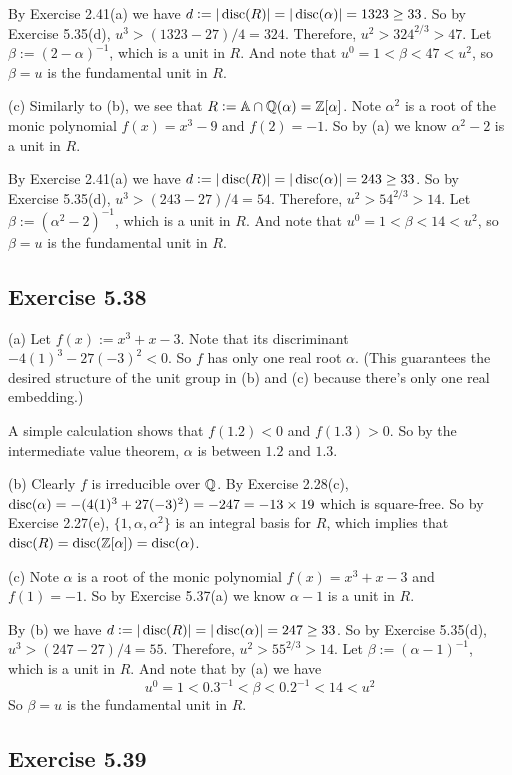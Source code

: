 \documentclass[../Marcus.tex]{subfiles}
\begin{document}
By Exercise 2.41(a) we have $d := |\operatorname{disc}(R)| = |\operatorname{disc}(\alpha)| = 1323 \geq 33$. So by Exercise 5.35(d), $u^3 > (1323-27)/4 = 324$. Therefore, $u^2 > 324^{2/3} > 47$. Let $\beta:=(2-\alpha)^{-1}$, which is a unit in $R$. And note that $u^0 = 1 < \beta < 47 < u^2$, so $\beta=u$ is the fundamental unit in $R$.

(c) Similarly to (b), we see that $R:= \mathbb{A}\cap\mathbb{Q}(\alpha) = \mathbb{Z}[\alpha]$. Note $\alpha^2$ is a root of the monic polynomial $f(x)=x^3-9$ and $f(2)=-1$. So by (a) we know $\alpha^2-2$ is a unit in $R$.

By Exercise 2.41(a) we have $d := |\operatorname{disc}(R)| = |\operatorname{disc}(\alpha)| = 243 \geq 33$. So by Exercise 5.35(d), $u^3 > (243-27)/4 = 54$. Therefore, $u^2 > 54^{2/3} > 14$. Let $\beta:=(\alpha^2-2)^{-1}$, which is a unit in $R$. And note that $u^0 = 1 < \beta < 14 < u^2$, so $\beta=u$ is the fundamental unit in $R$.

\subsection*{Exercise 5.38}

(a) Let $f(x):=x^3+x-3$. Note that its discriminant $-4(1)^3-27(-3)^2 < 0$. So $f$ has only one real root $\alpha$. (This guarantees the desired structure of the unit group in (b) and (c) because there's only one real embedding.)

A simple calculation shows that $f(1.2) < 0 $ and $f(1.3) > 0$. So by the intermediate value theorem, $\alpha$ is between $1.2$ and $1.3$.

(b) Clearly $f$ is irreducible over $\mathbb{Q}$. By Exercise 2.28(c), $\operatorname{disc}(\alpha) = -(4(1)^3+27(-3)^2) = -247 = -13\times 19$ which is square-free. So by Exercise 2.27(e), $\{1,\alpha,\alpha^2\}$ is an integral basis for $R$, which implies that $\operatorname{disc}(R) = \operatorname{disc}(\mathbb{Z}[\alpha]) = \operatorname{disc}(\alpha)$.

(c) Note $\alpha$ is a root of the monic polynomial $f(x)=x^3+x-3$ and $f(1)=-1$. So by Exercise 5.37(a) we know $\alpha-1$ is a unit in $R$.

By (b) we have $d := |\operatorname{disc}(R)| = |\operatorname{disc}(\alpha)| = 247 \geq 33$. So by Exercise 5.35(d), $u^3 > (247-27)/4 = 55$. Therefore, $u^2 > 55^{2/3} > 14$. Let $\beta:=(\alpha-1)^{-1}$, which is a unit in $R$. And note that by (a) we have
$$
u^0 = 1 < 0.3^{-1} < \beta < 0.2^{-1} < 14 < u^2
$$
So $\beta=u$ is the fundamental unit in $R$.

\subsection*{Exercise 5.39}
\end{document}
